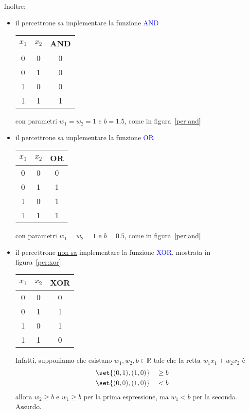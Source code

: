 \documentclass[10pt]{book}
\newcommand{\1}{\mathds{1}}
\newcommand{\R}{\mathds{R}}
\theoremstyle{definition}%
\theoremstyle{plain}
\theoremstyle{remark}
\renewcommand{\href}[2]{\textcolor{blue}{#2}}
\begin{document}
Inoltre:
\begin{itemize}
\item il percettrone sa implementare la funzione \href{../../../../../org/roam/20250710120853-and_logico.org}{AND}
\begin{center}
\begin{tabular}{c c c}
\hline
\(x_{1}\) & \(x_{2}\) & AND\\
\hline
0 & 0 & 0\\
0 & 1 & 0\\
1 & 0 & 0\\
1 & 1 & 1\\
\hline
\end{tabular}
\end{center}
con parametri \(w_{1}=w_{2}=1\) e \(b=1.5\), come in figura~\ref{per:and}

\item il percettrone sa implementare la funzione \href{../../../../../org/roam/20250710120858-or_logico.org}{OR}
\begin{center}
\begin{tabular}{c c c}
\hline
\(x_{1}\) & \(x_{2}\) & OR\\
\hline
0 & 0 & 0\\
0 & 1 & 1\\
1 & 0 & 1\\
1 & 1 & 1\\
\hline
\end{tabular}
\end{center}
con parametri \(w_{1}=w_{2}=1\) e \(b=0.5\), come in figura~\ref{per:and}
\item il percettrone \uline{non sa} implementare la funzione \href{../../../../../org/roam/20250710120916-xor_logico.org}{XOR}, mostrata in figura~\ref{per:xor}
\begin{center}
\begin{tabular}{c c c}
\hline
\(x_{1}\) & \(x_{2}\) & XOR\\
\hline
0 & 0 & 0\\
0 & 1 & 1\\
1 & 0 & 1\\
1 & 1 & 0\\
\hline
\end{tabular}
\end{center}
Infatti, supponiamo che esistano \(w_{1},w_{2},b \in\R\) tale che la retta \(w_{1}x_{1}+w_{2}x_{2}\) è
\begin{align*}
  \set{(0,1),(1,0)}\quad &\ge b\\
  \set{(0,0),(1,0)}\quad &<b
\end{align*}
allora \(w_{2}\ge b\) e \(w_{1}\ge b\) per la prima espressione, ma \(w_{1}<b\) per la seconda. Assurdo.
\end{itemize}
\end{document}
